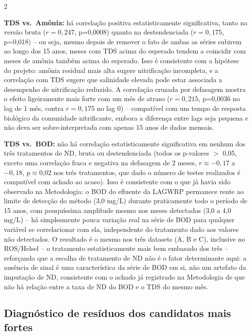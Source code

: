 \begin{multicols*}{2}

\textbf{TDS vs.\ Amônia:} há correlação positiva estatisticamente significativa, tanto na versão bruta ($r=0{,}247$, p=0,0008) quanto na destendenciada ($r=0{,}175$, p=0,018) -- ou seja, mesmo depois de remover o fato de ambas as séries subirem ao longo dos 15 anos, meses com TDS acima do esperado tendem a coincidir com meses de amônia também acima do esperado. Isso é consistente com a hipótese do projeto: amônia residual mais alta sugere nitrificação incompleta, e a correlação com TDS sugere que salinidade elevada pode estar associada a desempenho de nitrificação reduzido. A correlação cruzada por defasagem mostra o efeito ligeiramente mais forte com um mês de atraso ($r=0{,}215$, p=0,0036 no lag de 1 mês, contra $r=0{,}175$ no lag 0) -- compatível com um tempo de resposta biológico da comunidade nitrificante, embora a diferença entre lags seja pequena e não deva ser sobre-interpretada com apenas 15 anos de dados mensais.

\textbf{TDS vs.\ BOD:} não há correlação estatisticamente significativa em nenhum dos três tratamentos de ND, bruta ou destendenciada (todos os p-valores $>$ 0,05, exceto uma correlação fraca e negativa na defasagem de 2 meses, $r\approx-0{,}17$ a $-0{,}18$, p$\approx$0,02 nos três tratamentos, que dado o número de testes realizados é compatível com achado ao acaso). Isso é consistente com o que já havia sido observado na Metodologia: o BOD do efluente da LAGWRP permanece rente ao limite de detecção do método (3,0 mg/L) durante praticamente todo o período de 15 anos, com pouquíssima amplitude mesmo nos meses detectados (3,0 a 4,0 mg/L) -- há simplesmente pouca variação real na série de BOD para qualquer variável se correlacionar com ela, independente do tratamento dado aos valores não detectados. O resultado é o mesmo nos três datasets (A, B e C), inclusive no ROS/Helsel -- o tratamento estatisticamente mais bem embasado dos três -- reforçando que a escolha de tratamento de ND não é o fator determinante aqui: a ausência de sinal é uma característica da série de BOD em si, não um artefato da imputação de ND, consistente com o achado já registrado na Metodologia de que não há relação entre a taxa de ND do BOD e o TDS do mesmo mês.

\subsection{Diagnóstico de resíduos dos candidatos mais fortes}


\end{multicols*}
